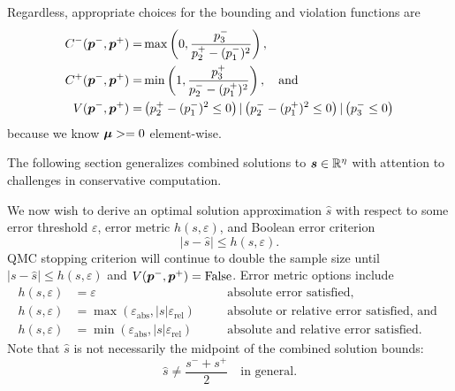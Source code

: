 \documentclass{article}[12pt]
\newcommand{\varepsabs}{\varepsilon_\text{abs}}
\newcommand{\varepsrel}{\varepsilon_\text{rel}}
\begin{document}
\begin{itemize}
    Regardless, appropriate choices for the bounding and violation functions are 
    \begin{align*}
        C^-(\boldsymbol{p}^-,\boldsymbol{p}^+) =& \max\left(0, \frac{p_3^-}{p_2^+ - (p_1^-)^2} \right), \\
        C^+(\boldsymbol{p}^-,\boldsymbol{p}^+) =& \min\left(1, \frac{p_3^+}{p_2^- - (p_1^+)^2}\right), \quad \text{and} \\
        V(\boldsymbol{p}^-,\boldsymbol{p}^+) =& \left(p_2^+-(p_1^-)^2 \leq 0\right) | \left(p_2^--(p_1^+)^2 \leq 0\right) | \left(p_3^- \leq 0\right)
    \end{align*}
    because we know $\boldsymbol{\mu}>=0$ element-wise. 
    
\end{itemize}
The following section generalizes combined solutions to $\boldsymbol{s} \in \mathbb{R}^\eta$ with attention to challenges in conservative computation. 

We now wish to derive an optimal solution approximation $\hat{s}$ with respect to some error threshold $\varepsilon$, error metric $h(s,\varepsilon)$, and Boolean error criterion 
$$\lvert s - \hat{s} \rvert \leq h(s,\varepsilon).$$
QMC stopping criterion will continue to double the sample size until $\lvert s - \hat{s} \rvert \leq h(s,\varepsilon)$ and $V(\boldsymbol{p}^-,\boldsymbol{p}^+) = \text{False}$. Error metric options include
\begin{subequations}
\begin{align}
    h(s,\varepsilon) & = \varepsilon \quad &&\text{absolute error satisfied}, \\
    h(s,\varepsilon) &= \max\left(\varepsabs,\lvert s \rvert \varepsrel \right) \quad &&\text{absolute or relative error satisfied, and } \label{eq:h_abs_or_rel} \\
    h(s,\varepsilon) &= \min\left(\varepsabs,\lvert s \rvert \varepsrel \right) \quad &&\text{absolute and relative error satisfied.} \label{eq:h_abs_and_rel}
\end{align}
\end{subequations}
Note that $\hat{s}$ is not necessarily the midpoint of the combined solution bounds:
\begin{equation}
    \hat{s} \neq \frac{s^-+s^+}{2} \quad \text{in general.}
\end{equation}
\end{document}
